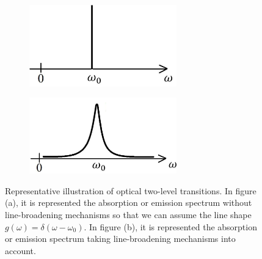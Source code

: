 \begin{figure}[H]
	\begin{subfigure}[t]{0.45\textwidth}
		\centering
		\includegraphics[width=0.7\textwidth]{USPSC-img/sharp_line.png}
		\vspace{5pt}
		\label{fig:shap-spectral-line}
	\end{subfigure}
	\hfill
	\begin{subfigure}[t]{0.45\textwidth}
		\centering
		\vspace{8pt}
		\includegraphics[width=0.7\textwidth]{USPSC-img/broadened_line.png}
		\vspace{5pt}
		\label{fig:broadened-spectral-line}
	\end{subfigure}

	\caption{Representative illustration of optical two-level transitions. In figure (a), it is represented the absorption or emission spectrum without line-broadening mechanisms so that we can assume the line shape $ g(\omega) = \delta(\omega - \omega_0) $. In figure (b), it is represented the absorption or emission spectrum taking line-broadening mechanisms into account.}
	\label{fig:spectral-broadening}
\end{figure}

